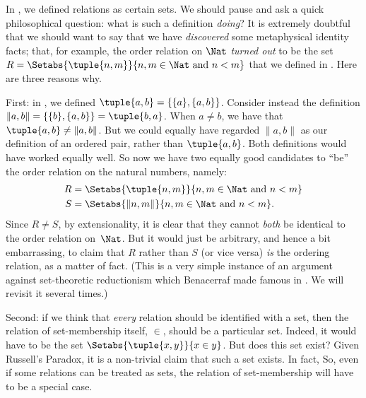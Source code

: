 \documentclass[../../../include/open-logic-section]{subfiles}
\begin{document}

In , we defined relations as certain sets. We should
pause and ask a quick philosophical question: what is such a
definition \emph{doing}? It is extremely doubtful that we should want
to say that we have \emph{discovered} some metaphysical identity
facts; that, for example, the order relation on $\Nat$ \emph{turned
out} to be the set $R=  \Setabs{\tuple{n,m}}{n, m \in \Nat\text{ and }
n < m}$ that we defined in . Here are three
reasons why. 

First: in , we defined $\tuple{a, b} =
\{\{a\}, \{a, b\}\}$. Consider instead the definition $\lVert a,
b\rVert = \{\{b\}, \{a, b\}\} = \tuple{b,a}$. When $a \neq b$, we have
that $\tuple{a, b} \neq \lVert a,b\rVert$. But we could equally have
regarded $\lVert a,b\rVert$ as our definition of an ordered pair,
rather than $\tuple{a,b}$. Both definitions would have worked equally
well. So now we have two equally good candidates to ``be'' the order
relation on the natural numbers, namely:
\begin{align*}
		R &= \Setabs{\tuple{n,m}}{n, m \in \Nat \text{ and }n < m}\\
		S &= \Setabs{\lVert n,m\rVert}{n, m \in \Nat \text{ and }n < m}.
\end{align*}
Since $R \neq S$, by extensionality, it is clear that they cannot
\emph{both} be identical to the order relation on~$\Nat$. But it would
just be arbitrary, and hence a bit embarrassing, to claim that $R$
rather than $S$ (or vice versa) \emph{is} the ordering relation, as a
matter of fact. (This is a very simple instance of an argument against
set-theoretic reductionism which Benacerraf made famous in
\citeyear{Benacerraf1965}. We will revisit it several times.)

Second: if we think that \emph{every} relation should be identified
with a set, then the relation of set-membership itself, $\in$, should
be a particular set. Indeed, it would have to be the set
$\Setabs{\tuple{x,y}}{x \in y}$. But does this set exist? Given
Russell's Paradox, it is a non-trivial claim that such a set exists.
In fact, 
So, even if some relations can be treated as sets, the relation of
set-membership will have to be a special case.
\end{document}
